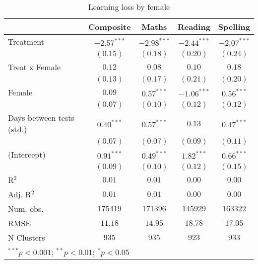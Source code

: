
\begin{table}
\begin{center}
\begin{tabular}{l c c c c}
\hline
 & Composite & Maths & Reading & Spelling \\
\hline
Treatment                 & $-2.57^{***}$ & $-2.98^{***}$ & $-2.44^{***}$ & $-2.07^{***}$ \\
                          & $(0.15)$      & $(0.18)$      & $(0.20)$      & $(0.24)$      \\
Treat x Female            & $0.12$        & $0.08$        & $0.10$        & $0.18$        \\
                          & $(0.13)$      & $(0.17)$      & $(0.21)$      & $(0.20)$      \\
Female                    & $0.09$        & $0.57^{***}$  & $-1.06^{***}$ & $0.56^{***}$  \\
                          & $(0.07)$      & $(0.10)$      & $(0.12)$      & $(0.12)$      \\
Days between tests (std.) & $0.40^{***}$  & $0.57^{***}$  & $0.13$        & $0.47^{***}$  \\
                          & $(0.07)$      & $(0.07)$      & $(0.09)$      & $(0.11)$      \\
(Intercept)               & $0.91^{***}$  & $0.49^{***}$  & $1.82^{***}$  & $0.66^{***}$  \\
                          & $(0.09)$      & $(0.10)$      & $(0.12)$      & $(0.15)$      \\
\hline
R$^2$                     & $0.01$        & $0.01$        & $0.00$        & $0.00$        \\
Adj. R$^2$                & $0.01$        & $0.01$        & $0.00$        & $0.00$        \\
Num. obs.                 & $175419$      & $171396$      & $145929$      & $163322$      \\
RMSE                      & $11.18$       & $14.95$       & $18.78$       & $17.05$       \\
N Clusters                & $935$         & $935$         & $923$         & $933$         \\
\hline
\multicolumn{5}{l}{\scriptsize{$^{***}p<0.001$; $^{**}p<0.01$; $^{*}p<0.05$}}
\end{tabular}
\caption{Learning loss by female}
\label{tablefemale}
\end{center}
\end{table}
